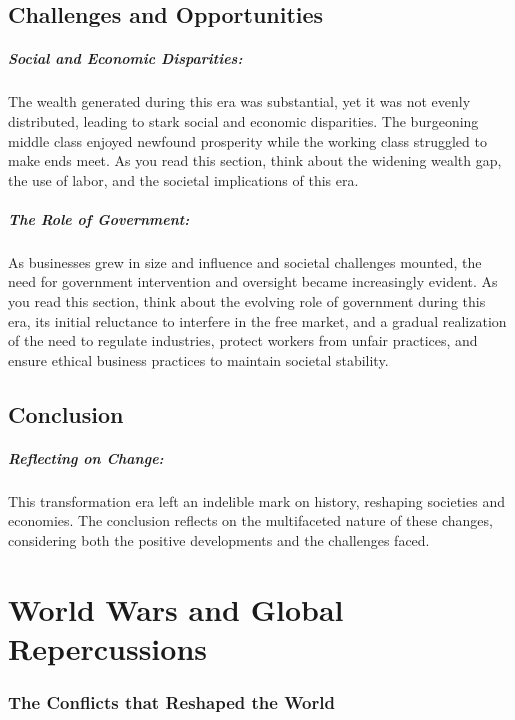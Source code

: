 \documentclass{book}
\begin{document}
\section*{Challenges and Opportunities}

\paragraph{Social and Economic Disparities:}
The wealth generated during this era was substantial, yet it was not evenly distributed, leading to stark social and economic disparities. The burgeoning middle class enjoyed newfound prosperity while the working class struggled to make ends meet. As you read this section, think about the widening wealth gap, the use of labor, and the societal implications of this era.

\paragraph{The Role of Government:}
As businesses grew in size and influence and societal challenges mounted, the need for government intervention and oversight became increasingly evident. As you read this section, think about the evolving role of government during this era, its initial reluctance to interfere in the free market, and a gradual realization of the need to regulate industries, protect workers from unfair practices, and ensure ethical business practices to maintain societal stability.

\section*{Conclusion}

\paragraph{Reflecting on Change:}
This transformation era left an indelible mark on history, reshaping societies and economies. The conclusion reflects on the multifaceted nature of these changes, considering both the positive developments and the challenges faced.

\chapter{World Wars and Global Repercussions}
\subsection*{The Conflicts that Reshaped the World}
\end{document}

